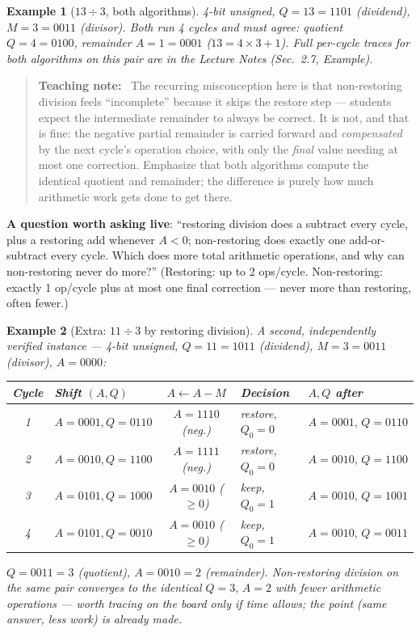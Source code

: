 \documentclass[11pt]{article}
\newtheorem{example}{Example}[section]
\newenvironment{teachingaside}{\begin{quote}\small\color{primary-gold}\textbf{Teaching note:}\ }{\end{quote}}
\begin{document}
\begin{example}[$13 \div 3$, both algorithms]
4-bit unsigned, $Q=13=1101$ (dividend), $M=3=0011$ (divisor). Both run 4 cycles and must agree: quotient $Q=4=0100$, remainder $A=1=0001$ ($13=4\times3+1$).  Full per-cycle traces for both algorithms on this pair are in the Lecture Notes (Sec.~2.7, Example).
\end{example}

\begin{teachingaside}
The recurring misconception here is that non-restoring division feels ``incomplete'' because it skips the restore step --- students expect the intermediate remainder to always be correct. It is not, and that is fine: the negative partial remainder is carried forward and \emph{compensated} by the next cycle's operation choice, with only the \emph{final} value needing at most one correction. Emphasize that both algorithms compute the identical quotient and remainder; the difference is purely how much arithmetic work gets done to get there.
\end{teachingaside}

\textbf{A question worth asking live}: ``restoring division does a subtract every cycle, plus a restoring add whenever $A<0$; non-restoring does exactly one add-or-subtract every cycle. Which does more total arithmetic operations, and why can non-restoring never do more?'' (Restoring: up to 2 ops/cycle. Non-restoring: exactly 1 op/cycle plus at most one final correction --- never more than restoring, often fewer.)

\begin{example}[Extra: $11 \div 3$ by restoring division]
A second, independently verified instance --- 4-bit unsigned, $Q=11=1011$ (dividend), $M=3=0011$ (divisor), $A=0000$:
\begin{center}
\small
\begin{tabular}{@{}clcll@{}}
\toprule
Cycle & Shift $(A,Q)$ & $A\gets A-M$ & Decision & $A,Q$ after \\
\midrule
1 & $A{=}0001,Q{=}0110$ & $A=1110$ (neg.) & restore, $Q_0{=}0$ & $A{=}0001,\,Q{=}0110$ \\
2 & $A{=}0010,Q{=}1100$ & $A=1111$ (neg.) & restore, $Q_0{=}0$ & $A{=}0010,\,Q{=}1100$ \\
3 & $A{=}0101,Q{=}1000$ & $A=0010$ ($\ge0$) & keep, $Q_0{=}1$ & $A{=}0010,\,Q{=}1001$ \\
4 & $A{=}0101,Q{=}0010$ & $A=0010$ ($\ge0$) & keep, $Q_0{=}1$ & $A{=}0010,\,Q{=}0011$ \\
\bottomrule
\end{tabular}
\end{center}
$Q=0011=3$ (quotient), $A=0010=2$ (remainder).  Non-restoring division on the same pair converges to the identical $Q=3,\,A=2$ with fewer arithmetic operations --- worth tracing on the board only if time allows; the point (same answer, less work) is already made.
\end{example}
\end{document}
